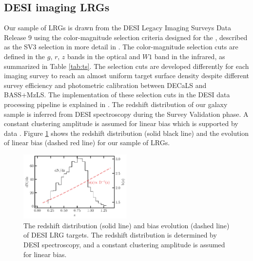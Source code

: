 \subsection{DESI imaging LRGs}
Our sample of LRGs is drawn from the DESI Legacy Imaging Surveys Data Release 9 \citep[DR9;][]{dey2018overview} using the color-magnitude selection criteria designed for the , described as the SV3 selection in more detail in \cite{zhou2022target}. The color-magnitude selection cuts are defined in the $g$, $r$, $z$ bands in the optical and $W1$ band in the infrared, as summarized in Table \ref{tab:ts}. The selection cuts are developed differently for each imaging survey to reach an almost uniform target surface density despite different survey efficiency and photometric calibration between DECaLS and BASS+MzLS. The implementation of these selection cuts in the DESI data processing pipeline is explained in \cite{myers2022}. The redshift distribution of our galaxy sample is inferred from DESI spectroscopy during the Survey Validation phase. A constant clustering amplitude is assumed for linear bias which is supported by data \citep{zhou2021clustering}. Figure \ref{fig:nz} shows the redshift distribution (solid black line) and the evolution of linear bias (dashed red line) for our sample of LRGs.

\begin{figure}
 \centering
 \includegraphics[width=0.5\textwidth]{figures/nz_lrg.pdf}
 \caption{The redshift distribution (solid line) and bias evolution (dashed line) of DESI LRG targets. The redshift distribution is determined by DESI spectroscopy, and a constant clustering amplitude is assumed for linear bias.}
 \label{fig:nz}
\end{figure}

